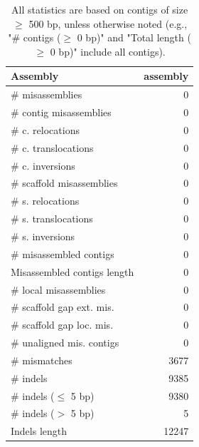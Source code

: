\documentclass[12pt,a4paper]{article}
\begin{document}
\begin{table}[ht]
\begin{center}
\caption{All statistics are based on contigs of size $\geq$ 500 bp, unless otherwise noted (e.g., "\# contigs ($\geq$ 0 bp)" and "Total length ($\geq$ 0 bp)" include all contigs).}
\begin{tabular}{|l*{1}{|r}|}
\hline
Assembly & assembly \\ \hline
\# misassemblies & 0 \\ \hline
\hspace{2mm}\# contig misassemblies & 0 \\ \hline
\hspace{5mm}\# c. relocations & 0 \\ \hline
\hspace{5mm}\# c. translocations & 0 \\ \hline
\hspace{5mm}\# c. inversions & 0 \\ \hline
\hspace{2mm}\# scaffold misassemblies & 0 \\ \hline
\hspace{5mm}\# s. relocations & 0 \\ \hline
\hspace{5mm}\# s. translocations & 0 \\ \hline
\hspace{5mm}\# s. inversions & 0 \\ \hline
\# misassembled contigs & 0 \\ \hline
Misassembled contigs length & 0 \\ \hline
\# local misassemblies & 0 \\ \hline
\# scaffold gap ext. mis. & 0 \\ \hline
\# scaffold gap loc. mis. & 0 \\ \hline
\# unaligned mis. contigs & 0 \\ \hline
\# mismatches & 3677 \\ \hline
\# indels & 9385 \\ \hline
\hspace{5mm}\# indels ($\leq$ 5 bp) & 9380 \\ \hline
\hspace{5mm}\# indels ($>$ 5 bp) & 5 \\ \hline
Indels length & 12247 \\ \hline
\end{tabular}
\end{center}
\end{table}
\end{document}
